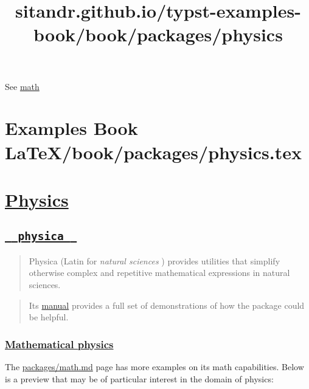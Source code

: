 See \href{./math.html}{math}


\section{Examples Book LaTeX/book/packages/physics.tex}
\title{sitandr.github.io/typst-examples-book/book/packages/physics}

\section{\texorpdfstring{\hyperref[physics]{Physics}}{Physics}}\label{physics}

\subsection{\texorpdfstring{\hyperref[physica]{\texttt{\ }{\texttt{\ physica\ }}\texttt{\ }}}{  physica  }}\label{physica}

\begin{quote}
Physica (Latin for \emph{natural sciences} ) provides utilities that
simplify otherwise complex and repetitive mathematical expressions in
natural sciences.
\end{quote}

\begin{quote}
Its
\href{https://github.com/Leedehai/typst-physics/blob/master/physica-manual.pdf}{manual}
provides a full set of demonstrations of how the package could be
helpful.
\end{quote}

\subsubsection{\texorpdfstring{\hyperref[mathematical-physics]{Mathematical
physics}}{Mathematical physics}}\label{mathematical-physics}

The \href{./math.html\#common-notations}{packages/math.md} page has more
examples on its math capabilities. Below is a preview that may be of
particular interest in the domain of physics:

